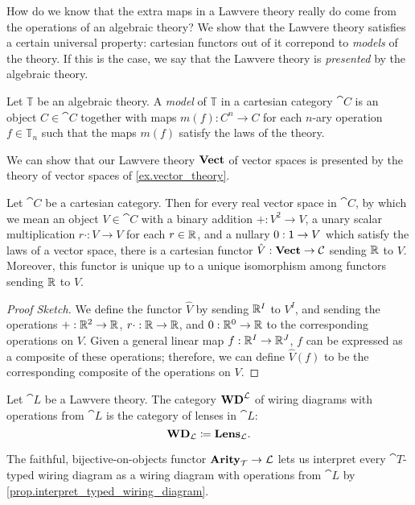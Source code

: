 \documentclass[DynamicalBook]{subfiles}
\begin{document}
How do we know that the extra maps in a Lawvere theory really do come from the
operations of an algebraic theory? We show that the Lawvere theory satisfies a
certain universal property: cartesian functors out of it correpond to
\emph{models} of the theory. If this is the case, we say that the Lawvere theory
is \emph{presented} by the algebraic theory.

\begin{informal}
Let $\mathbb{T}$ be an algebraic theory. A \emph{model} of $\mathbb{T}$ in a
cartesian category $\cat{C}$ is an object $C \in \cat{C}$ together with maps $m(f)
: C^n \to C$ for each $n$-ary operation $f \in \mathbb{T}_n$ such that the maps
$m(f)$ satisfy the laws of the theory.
\end{informal}


We can show that our Lawvere theory $\textbf{Vect}$ of vector spaces is presented
by the theory of vector spaces of \cref{ex.vector_theory}.
\begin{proposition}
Let $\cat{C}$ be a cartesian category. Then for every real vector space in
$\cat{C}$, by which we mean an object $V \in \cat{C}$ with a binary addition
$+ : V^2 \to V$, a unary scalar multiplication $r\cdot : V \to V$ for each $r
\in \mathbb{R}$, and a nullary $0 : \mathsf{1} \to V$ which satisfy the laws of a vector
space, there is a cartesian functor $\hat{V} : \textbf{Vect} \to \mathcal{C}$ sending
$\mathbb{R}$ to $V$. Moreover, this functor is unique up to a unique isomorphism among
functors sending $\mathbb{R}$ to $V$.
\end{proposition}
\begin{proof}[Proof Sketch]
  We define the functor $\hat{V}$ by sending $\mathbb{R}^I$ to $V^I$, and sending the
  operations $+ : \mathbb{R}^2 \to \mathbb{R}$, $r \cdot : \mathbb{R} \to \mathbb{R}$, and $0 : \mathbb{R}^0 \to
  \mathbb{R}$ to the corresponding operations on $V$. Given a general linear map $f :
  \mathbb{R}^I \to \mathbb{R}^J$, $f$ can be expressed as a composite of these operations;
  therefore, we can define $\hat{V}(f)$ to be the corresponding composite of the
  operations on $V$. 
\end{proof}

\begin{definition}
Let $\cat{L}$ be a Lawvere theory. The category $\textbf{WD}^{\mathcal{L}}$ of wiring
diagrams with operations from $\cat{L}$ is the category of lenses in $\cat{L}$:
\[
\textbf{WD}_{\mathcal{L}} \coloneqq \textbf{Lens}_{ \mathcal{L} }.
\]
\end{definition}

\begin{remark}
The faithful, bijective-on-objects functor $\textbf{Arity}_{\mathcal{T}} \to \mathcal{L}$ lets
us interpret every $\cat{T}$-typed wiring diagram as a wiring diagram with
operations from $\cat{L}$ by \cref{prop.interpret_typed_wiring_diagram}.
\end{remark}
\end{document}
